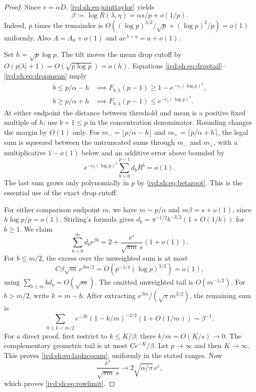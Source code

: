 \documentclass[11pt,letterpaper]{article}
\theoremstyle{remark}\newtheorem{remark}[theorem]{Remark}
\numberwithin{equation}{section}
\begin{document}
\begin{proof}
Since $v=\alpha D$, \eqref{ivd:sh:eq:jointtaylor} yields
\begin{equation}\label{ivd:sh:eq:betaroot}
 \beta:=\log R(\lambda,\eta)=\alpha s/p+o(1/p).
\end{equation}
Indeed, $p$ times the remainder is
$O((\log p)^{3/2}/\sqrt p+(\log p)^2/p)=o(1)$ uniformly.
Also $A=A_0+o(1)$ and $ae^{\lambda+\eta}=a+o(1)$.

Set $h=\sqrt p\log p$. The tilt moves the mean drop cutoff by
$O(p|\lambda|+1)=O(\sqrt{p\log p})=o(h)$.
Equations \eqref{ivd:sh:eq:droptail}--\eqref{ivd:sh:eq:dropmean} imply
\begin{align}
 b\le p/\alpha-h&\implies F_{b,\lambda}(p-1)
       \ge1-e^{-c_1(\log p)^2},\label{ivd:sh:eq:cutlower}\\
 b\ge p/\alpha+h&\implies F_{b,\lambda}(p-1)
       \le e^{-c_1(\log p)^2}.
 \label{ivd:sh:eq:cutupper}
\end{align}
At either endpoint the distance between threshold and mean is a
positive fixed multiple of $h$; use $b+1\le p$ in the concentration
denominator. Rounding changes the margin by $O(1)$ only.
For $m_-=\lfloor p/\alpha-h\rfloor$ and
$m_+=\lceil p/\alpha+h\rceil$, the legal sum is squeezed between
the untruncated sums through $m_-$ and $m_+$, with a multiplicative
$1-o(1)$ below and an additive error above bounded by
\[
 e^{-c_1(\log p)^2}\sum_{b=0}^{p-1}d_bR^b=o(1).
\]
The last sum grows only polynomially in $p$ by \eqref{ivd:sh:eq:betaroot}.
This is the essential use of the exact drop cutoff.

For either comparison endpoint $m$, we have $m\sim p/\alpha$ and
$m\beta=s+o(1)$, since $h\log p/p=o(1)$. Stirling's formula gives
$d_b=\pi^{-1/2}b^{-3/2}(1+O(1/b))$ for $b\ge1$.
We claim
\begin{equation}\label{ivd:sh:eq:laplacesum}
 \sum_{b=0}^m d_b e^{\beta b}
   =2+\frac{e^s}{\sqrt{\pi m}\,s}(1+o(1)).
\end{equation}
For $b\le m/2$, the excess over the unweighted sum is at most
\[
 C\beta\sqrt m\,e^{\beta m/2}
 =O(p^{-1/4}(\log p)^{3/2})=o(1),
\]
using $\sum_{b\le m}b d_b=O(\sqrt m)$.
The omitted unweighted tail is $O(m^{-1/2})$.
For $b>m/2$, write $k=m-b$. After extracting
$e^{\beta m}/(\sqrt\pi m^{3/2})$, the remaining sum is
\[
 \sum_{0\le k<m/2}e^{-\beta k}(1-k/m)^{-3/2}(1+O(1/m))
 \sim\beta^{-1}.
\]
For a direct proof, first restrict to $k\le K/\beta$; there
$k/m=O(K/s)\to0$. The complementary geometric tail is at most
$C e^{-K}/\beta$. Let $p\to\infty$ and then $K\to\infty$.
This proves \eqref{ivd:sh:eq:laplacesum}, uniformly in the stated ranges.
Now
\[
 \frac{e^s}{\sqrt{\pi m}\,s}\longrightarrow
  2\sqrt{\alpha/\pi}\,e^c,
\]
which proves \eqref{ivd:sh:eq:rowlimit}.


\end{proof}
\end{document}
